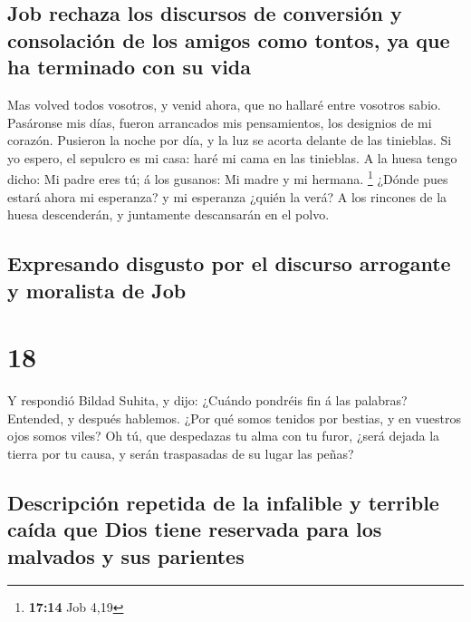 \hypertarget{job-rechaza-los-discursos-de-conversiuxf3n-y-consolaciuxf3n-de-los-amigos-como-tontos-ya-que-ha-terminado-con-su-vida}{%
\subsection{Job rechaza los discursos de conversión y consolación de los
amigos como tontos, ya que ha terminado con su
vida}\label{job-rechaza-los-discursos-de-conversiuxf3n-y-consolaciuxf3n-de-los-amigos-como-tontos-ya-que-ha-terminado-con-su-vida}}

 Mas volved todos vosotros, y venid ahora, que no hallaré
entre vosotros sabio.  Pasáronse mis días, fueron
arrancados mis pensamientos, los designios de mi corazón.
 Pusieron la noche por día, y la luz se acorta delante de
las tinieblas.  Si yo espero, el sepulcro es mi casa:
haré mi cama en las tinieblas.  A la huesa tengo dicho:
Mi padre eres tú; á los gusanos: Mi madre y mi hermana. \footnote{\textbf{17:14}
  Job 4,19}  ¿Dónde pues estará ahora mi esperanza? y mi
esperanza ¿quién la verá?  A los rincones de la huesa
descenderán, y juntamente descansarán en el polvo.

\hypertarget{expresando-disgusto-por-el-discurso-arrogante-y-moralista-de-job}{%
\subsection{Expresando disgusto por el discurso arrogante y moralista de
Job}\label{expresando-disgusto-por-el-discurso-arrogante-y-moralista-de-job}}

\hypertarget{section-17}{%
\section{18}\label{section-17}}

 Y respondió Bildad Suhita, y dijo:  ¿Cuándo
pondréis fin á las palabras? Entended, y después hablemos.
 ¿Por qué somos tenidos por bestias, y en vuestros ojos
somos viles?  Oh tú, que despedazas tu alma con tu furor,
¿será dejada la tierra por tu causa, y serán traspasadas de su lugar las
peñas?

\hypertarget{descripciuxf3n-repetida-de-la-infalible-y-terrible-cauxedda-que-dios-tiene-reservada-para-los-malvados-y-sus-parientes}{%
\subsection{Descripción repetida de la infalible y terrible caída que
Dios tiene reservada para los malvados y sus
parientes}\label{descripciuxf3n-repetida-de-la-infalible-y-terrible-cauxedda-que-dios-tiene-reservada-para-los-malvados-y-sus-parientes}}

